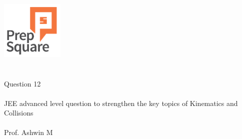 \documentclass{beamer}
\begin{document}
\begin{center}
\ \\ \ \\
\includegraphics[width=30mm]{Logo-final.png} \\
\ \\ \ \\ 
{\huge Question 12 \\ \ \\ }
{\Large
JEE advanced level question to strengthen the key topics of Kinematics and Collisions
}
{\large \ \\ \ \\ Prof. Ashwin M }
\end{center}
\end{document}
